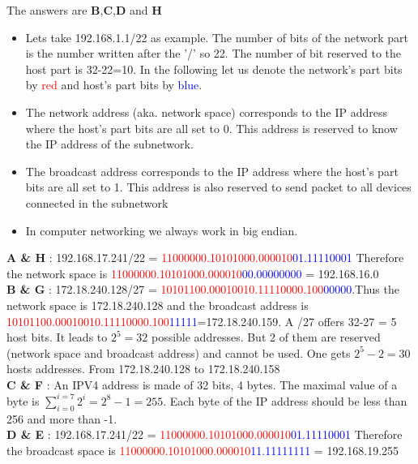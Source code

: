 \documentclass[en]{sourcefiles/eplexam}
\begin{document}
\begin{solution}
The answers are \textbf{B},\textbf{C},\textbf{D} and \textbf{H}\\

\begin{itemize}
    \item Lets take 192.168.1.1/22 as example. The number of bits of the network part is the number written after the '/' so 22. The number of bit reserved to the host part is 32-22=10. In the following let us denote the network's part bits by \textcolor{red}{red} and host's part bits by \textcolor{blue}{blue}.
    \item The network address (aka. network space) corresponds to the IP address where the host's part bits are all set to 0. This address is reserved to know the IP address of the subnetwork.
    \item The broadcast address corresponds to the IP address where the host's part bits are all set to 1. This address is also reserved to send packet to all devices connected in the subnetwork
    \item In computer networking we always work in big endian.
\end{itemize}
\noindent\textbf{A \& H} : 192.168.17.241/22 = \textcolor{red}{11000000.10101000.000010}\textcolor{blue}{01.11110001} Therefore the network space is \textcolor{red}{11000000.10101000.000010}\textcolor{blue}{00.00000000} = 192.168.16.0 \\
\newline
\noindent\textbf{B \& G} : 172.18.240.128/27 = \textcolor{red}{10101100.00010010.11110000.100}\textcolor{blue}{00000}.Thus the network space is 172.18.240.128 and the broadcast address is \textcolor{red}{10101100.00010010.11110000.100}\textcolor{blue}{11111}=172.18.240.159. A /27 offers 32-27 = 5 host bits. It leads to $2^5 =32$ possible addresses. But 2 of them are reserved (network space and broadcast address) and cannot be used. One gets $2^5-2 = 30$ hosts addresses. From 172.18.240.128 to 172.18.240.158\\
\newline
\noindent \textbf{C \& F} : An IPV4 address is made of 32 bits, 4 bytes. The maximal value of a byte is $\sum_{i=0}^{i=7}2^i = 2^8-1= 255$. Each byte of the IP address should be less than 256 and more than -1.\\
\newline 
\textbf{D \& E} : 192.168.17.241/22 = \textcolor{red}{11000000.10101000.000010}\textcolor{blue}{01.11110001} Therefore the broadcast space is \textcolor{red}{11000000.10101000.000010}\textcolor{blue}{11.11111111} = 192.168.19.255\\
\end{solution}
\end{document}

